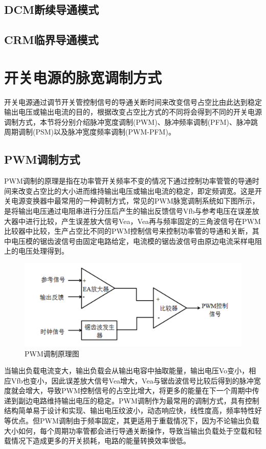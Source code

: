\subsection{DCM断续导通模式}




\subsection{CRM临界导通模式}




\section{开关电源的脉宽调制方式}
开关电源通过调节开关管控制信号的导通关断时间来改变信号占空比由此达到稳定输出电压或输出电流的目的，根据改变占空比方式的不同将会得到不同的开关电源调制方式，本节将分别介绍脉冲宽度调制(PWM)、脉冲频率调制(PFM)、脉冲跳周期调制(PSM)以及脉冲宽度频率调制(PWM-PFM)。

\subsection{PWM调制方式}
PWM调制的原理是指在功率管开关频率不变的情况下通过控制功率管管的导通时间来改变占空比的大小进而维持输出电压或输出电流的稳定，即定频调宽。这是开关电源变换器中最常用的一种调制方式，常见的PWM脉宽调制系统如下图所示，是将输出电压通过电阻串进行分压后产生的输出反馈信号Vfb与参考电压在误差放大器中进行比较，产生误差放大信号Vea，Vea再与频率固定的三角波信号在PWM比较器中比较，生产占空比不同的PWM控制信号来控制功率管的导通和关断，其中电压模的锯齿波信号由固定电路给定，电流模的锯齿波信号由原边电流采样电阻上的电压处理得到。

\begin{figure}[htbp] 
    \centering
    \includegraphics[width=0.8\linewidth]{figures/PWM调制1.png}
    \caption{PWM调制原理图}
    \label{fig:PWM调制1}
\end{figure}

当输出负载电流变大，输出负载会从输出电容中抽取能量，输出电压Vo变小，相应Vfb也变小，因此误差放大信号Vea增大，Vea与锯齿波信号比较后得到的脉冲宽度就会增大，导致PWM控制信号的占空比增大，将更多的能量在下一个周期中传递到副边电路维持输出电压的稳定。PWM调制作为最常用的调制方式，具有控制结构简单易于设计和实现、输出电压纹波小，动态响应快，线性度高，频率特性好等优点。但PWM调制由于频率固定，其更适用于重载情况下，因为不论输出负载大小如何，每个周期功率管都会进行导通关断操作，导致当输出负载处于空载和轻载情况下造成更多的开关损耗，电路的能量转换效率很低。

